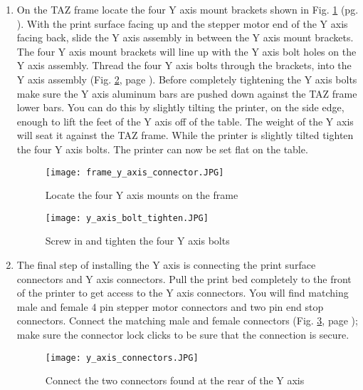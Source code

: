 \begin{enumerate}
\item On the TAZ frame locate the four Y axis mount brackets shown in Fig. \ref{fig:frame_Y_axis_mounts} (pg. \pageref{fig:frame_Y_axis_mounts}). With the print surface facing up and the stepper motor end of the Y axis facing back, slide the Y axis assembly in between the Y axis mount brackets. The four Y axis mount brackets will line up with the Y axis bolt holes on the Y axis assembly. Thread the four Y axis bolts through the brackets, into the Y axis assembly (Fig. \ref{fig:Y_axis_bolts_tighten}, page \pageref{fig:Y_axis_bolts_tighten}). Before completely tightening the Y axis bolts make sure the Y axis aluminum bars are pushed down against the TAZ frame lower bars. You can do this by slightly tilting the printer, on the side edge, enough to lift the feet of the Y axis off of the table. The weight of the Y axis will seat it against the TAZ frame. While the printer is slightly tilted tighten the four Y axis bolts. The printer can now be set flat on the table.
\begin{figure}[H]
\centering
\texttt{[image: frame\_y\_axis\_connector.JPG]}
\caption{Locate the four Y axis mounts on the frame}
\label{fig:frame_Y_axis_mounts}
\end{figure}

\begin{figure}[H]
\centering
\texttt{[image: y\_axis\_bolt\_tighten.JPG]}
\caption{Screw in and tighten the four Y axis bolts}
\label{fig:Y_axis_bolts_tighten}
\end{figure}

\item The final step of installing the Y axis is connecting the print surface connectors and Y axis connectors. Pull the print bed completely to the front of the printer to get access to the Y axis connectors. You will find matching male and female 4 pin stepper motor connectors and two pin end stop connectors. Connect the matching male and female connectors (Fig. \ref{fig:Y_axis_connectors}, page \pageref{fig:Y_axis_connectors}); make sure the connector lock clicks to be sure that the connection is secure.


\begin{figure}[H]
\centering
\texttt{[image: y\_axis\_connectors.JPG]}
\caption{Connect the two connectors found at the rear of the Y axis}
\label{fig:Y_axis_connectors}
\end{figure}


\end{enumerate}
